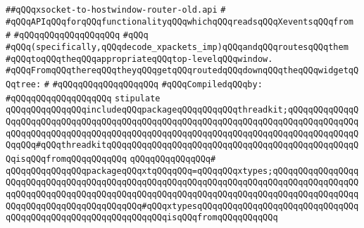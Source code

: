 \label{src/lib/x-kit/xclient/src/window/xsocket-to-hostwindow-router-old.api}
\verb|##qQQqxsocket-to-hostwindow-router-old.api|\newline
\verb|#|\newline
\verb|#qQQqAPIqQQqforqQQqfunctionalityqQQqwhichqQQqreadsqQQqXeventsqQQqfrom|\newline
\verb|#|\newline
\verb|#qQQqqQQqqQQqqQQqqQQq|\newline
\verb|#qQQq|\newline
\verb|#qQQq(specifically,qQQqdecode_xpackets_imp)qQQqandqQQqroutesqQQqthem|\newline
\verb|#qQQqtoqQQqtheqQQqappropriateqQQqtop-levelqQQqwindow.|\newline
\verb|#qQQqFromqQQqthereqQQqtheyqQQqgetqQQqroutedqQQqdownqQQqtheqQQqwidgetqQQqtree:|\newline
\verb|#|\newline
\verb|#qQQqqQQqqQQqqQQqqQQq|\newline
\newline
\verb|#qQQqCompiledqQQqby:|\newline
\verb|#qQQqqQQqqQQqqQQqqQQq|\newline
\newline
\newline
\newline
\verb|stipulate|\newline
\verb|qQQqqQQqqQQqqQQqincludeqQQqpackageqQQqqQQqqQQqthreadkit;qQQqqQQqqQQqqQQqqQQqqQQqqQQqqQQqqQQqqQQqqQQqqQQqqQQqqQQqqQQqqQQqqQQqqQQqqQQqqQQqqQQqqQQqqQQqqQQqqQQqqQQqqQQqqQQqqQQqqQQqqQQqqQQqqQQqqQQqqQQqqQQqqQQqqQQqqQQqqQQq#qQQqthreadkitqQQqqQQqqQQqqQQqqQQqqQQqqQQqqQQqqQQqqQQqqQQqqQQqqQQqisqQQqfromqQQqqQQqqQQq|\newline
\verb|qQQqqQQqqQQqqQQq#|\newline
\verb|qQQqqQQqqQQqqQQqpackageqQQqxtqQQqqQQq=qQQqqQQqxtypes;qQQqqQQqqQQqqQQqqQQqqQQqqQQqqQQqqQQqqQQqqQQqqQQqqQQqqQQqqQQqqQQqqQQqqQQqqQQqqQQqqQQqqQQqqQQqqQQqqQQqqQQqqQQqqQQqqQQqqQQqqQQqqQQqqQQqqQQqqQQqqQQqqQQqqQQqqQQqqQQqqQQqqQQqqQQqqQQqqQQqqQQq#qQQqxtypesqQQqqQQqqQQqqQQqqQQqqQQqqQQqqQQqqQQqqQQqqQQqqQQqqQQqqQQqqQQqqQQqisqQQqfromqQQqqQQqqQQq|\newline

